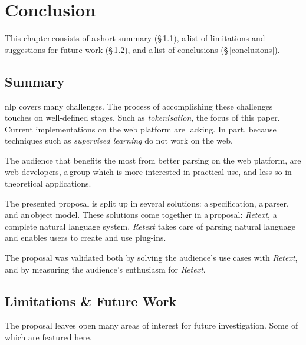 \chapter{Conclusion}\label{conclusion}

This chapter\,consists of a\,short summary (§\,\ref{summary}), a\,list of
  limitations and suggestions for future work
  (§\,\ref{limitations-future-work}), and a\,list of conclusions
  (§\,\ref{conclusions}).

\section{Summary}\label{summary}

\gls{nlp} covers many challenges.
The process of accomplishing these challenges touches on well-defined stages.
Such as \emph{tokenisation}, the focus of this paper.
Current implementations on the web platform are lacking.
In part, because techniques such as \emph{supervised learning} do not work
  on the web.

The audience that benefits the most from better parsing on the web platform,
  are web developers, a\,group which is more interested in practical use, and
  less so in theoretical applications.

The presented proposal is split up in several solutions: a\,specification,
  a\,parser, and an\,object model.
These solutions come together in a\,proposal: \emph{Retext}, a\,complete
  natural language system.
\emph{Retext} takes care of parsing natural language and enables users to
  create and use plug-ins.

The proposal was validated both by solving the audience's use cases with
  \emph{Retext}, and by measuring the audience's enthusiasm for \emph{Retext}.

\section{Limitations \& Future Work}\label{limitations-future-work}

The proposal leaves open many areas of interest for future investigation.
Some of which are featured here.

